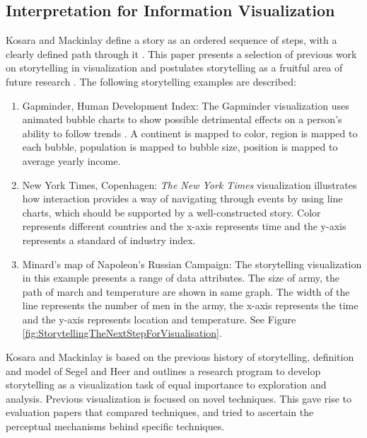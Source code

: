 \documentclass{egpubl}
\begin{document}
\subsection{Interpretation for Information Visualization}
Kosara and Mackinlay define a story as an ordered sequence of steps, with a clearly defined path through it \cite{Kosara}.
This paper presents a selection of previous work on storytelling in visualization and postulates storytelling as a fruitful area of future research \cite{Kosara}. The following storytelling examples are described:
\begin{enumerate}
\item Gapminder, Human Development Index: The Gapminder visualization uses animated bubble charts to show possible detrimental effects on a person's ability to follow trends \cite{Rebortson}. A continent is mapped to color, region is mapped to each bubble, population is mapped to bubble size, position is mapped to average yearly income.
\item New York Times, Copenhagen: \textit{The New York Times} visualization illustrates how interaction provides a way of navigating through events by using line charts, which should be supported by a well-constructed story. Color represents different countries and the x-axis represents time and the y-axis represents a standard of industry index.
\item Minard's map of Napoleon's Russian Campaign: The storytelling visualization in this example presents a range of data attributes.  The size of army, the path of march and temperature are shown in same graph. The width of the line represents the number of men in the army, the x-axis represents the time and the y-axis represents location and temperature. See Figure \ref{fig:StorytellingTheNextStepForVisualisation}.
\end{enumerate}
Kosara and Mackinlay is based on  the previous history of storytelling, definition and model of Segel and Heer \cite{segal} and outlines a research program to develop storytelling as a visualization task of equal importance to exploration and analysis. Previous visualization is focused on novel techniques. This gave rise to evaluation papers 
that compared techniques, and tried to ascertain the perceptual mechanisms behind specific techniques.
\end{document}
